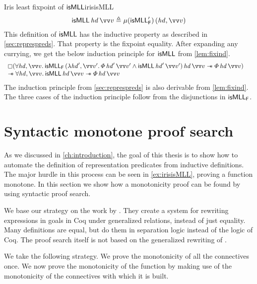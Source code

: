 \documentclass[thesis.tex]{subfiles}
\begin{document}
\begin{example}{Iris least fixpoint of $\textsf{\upshape isMLL}$}{irisisMLL}
  \begin{align*}
    \isMLL\, \hd\, \vect{\val} \eqdef \lfp(\isMLL'_\hopred)\, (\hd, \vect{\val})
  \end{align*}
  This definition of $\textsf{\upshape isMLL}$ has the inductive property as described in \cref{sec:represpreds}. That property is the fixpoint equality. After expanding any currying, we get the below induction principle for $\textsf{\upshape isMLL}$ from \cref{lem:fixind}.
  \begin{align*}
     & \begin{array}{l}
         \always(\All\hd,\vect{\val}.\isMLL_\hopred\,(\Lam\hd',\vect{\val}'. \pred\,\hd'\,\vect{\val}' \land \isMLL\,\hd'\,\vect{\val}')\,\hd\,\vect{\val} \wand \pred\,\hd\,\vect{\val}) \\
         \wand \All\hd,\vect{\val}. \isMLL\,\hd\,\vect{\val} \wand \pred\,\hd\,\vect{\val}
       \end{array}
  \end{align*}
  The induction principle from \cref{sec:represpreds} is also derivable from \cref{lem:fixind}. The three cases of the induction principle follow from the disjunctions in $\textsf{\upshape isMLL}_{\textsf{\upshape F}}$.

\end{example}

\section{Syntactic monotone proof search}
\label{sec:monoproofsearch}%
As we discussed in \cref{ch:introduction}, the goal of this thesis is to show how to automate the definition of representation predicates from inductive definitions. The major hurdle in this process can be seen in \cref{ex:irisisMLL}, proving a function monotone. In this section we show how a monotonicity proof can be found by using syntactic proof search.

We base our strategy on the work by  \cite{sozeauNewLookGeneralized2009}. They create a system for rewriting expressions in goals in Coq under generalized relations, instead of just equality. Many definitions are equal, but do them in separation logic instead of the logic of Coq. The proof search itself is not based on the generalized rewriting of .

We take the following strategy. We prove the monotonicity of all the connectives once. We now prove the monotonicity of the function by making use of the monotonicity of the connectives with which it is built.
\end{document}
